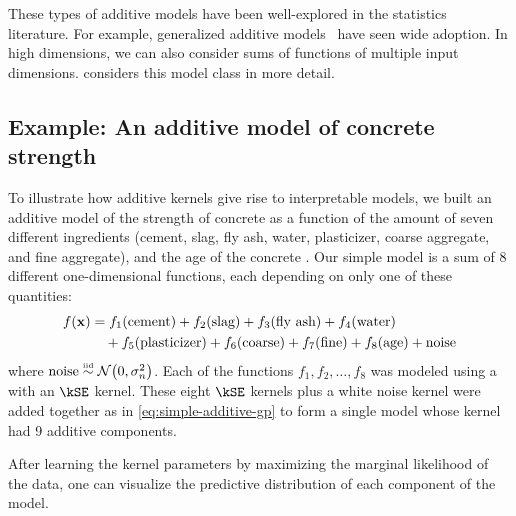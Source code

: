 These types of additive models have been well-explored in the statistics literature.
For example, generalized additive models~\citep{hastie1990generalized} have seen wide adoption.
In high dimensions, we can also consider sums of functions of multiple input dimensions.
 considers this model class in more detail.




\subsection{Example: An additive model of concrete strength}
\label{sec:concrete}

To illustrate how additive kernels give rise to interpretable models, we built an additive model of the strength of concrete as a function of the amount of seven different ingredients (cement, slag, fly ash, water, plasticizer, coarse aggregate, and fine aggregate), and the age of the concrete \citep{yeh1998modeling}.
Our simple model is a sum of 8 different one-dimensional functions, each depending on only one of these quantities:
%
\begin{align}
f({\bf{x}}) & = 
f_1(\textnormal{cement}) + f_2(\textnormal{slag}) + f_3(\textnormal{fly ash}) + f_4(\textnormal{water}) \nonumber \\
& \quad + f_5(\textnormal{plasticizer}) + f_6(\textnormal{coarse}) + f_7(\textnormal{fine}) + f_8(\textnormal{age}) + \textnormal{noise}
\label{eq:concrete}
\end{align}
%
where $\textnormal{noise} \overset{\mbox{\tiny iid}}{\sim} \mathcal{N}\!\left(0,\sigma^2_n\right)$.
Each of the functions $f_1, f_2, \ldots, f_8$ was modeled using a \gp{} with an $\kSE$ kernel.
These eight $\kSE$ kernels plus a white noise kernel were added together as in \cref{eq:simple-additive-gp} to form a single \gp{} model whose kernel had 9 additive components.

After learning the kernel parameters by maximizing the marginal likelihood of the data, one can visualize the predictive distribution of each component of the model.

